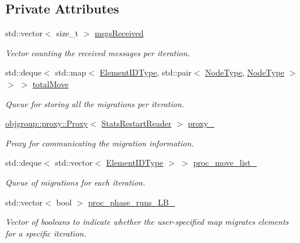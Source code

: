 \subsection*{Private Attributes}
\begin{DoxyCompactItemize}
\item 
std\+::vector$<$ size\+\_\+t $>$ \hyperlink{structvt_1_1vrt_1_1collection_1_1balance_1_1_stats_restart_reader_aac24c7a1c06519aaa6b3af18276415b4}{msgs\+Received}
\begin{DoxyCompactList}\small\item\em Vector counting the received messages per iteration. \end{DoxyCompactList}\item 
std\+::deque$<$ std\+::map$<$ \hyperlink{namespacevt_1_1vrt_1_1collection_1_1balance_a14c8d2c972f2913aa3f1636e5be0a120}{Element\+I\+D\+Type}, std\+::pair$<$ \hyperlink{namespacevt_a866da9d0efc19c0a1ce79e9e492f47e2}{Node\+Type}, \hyperlink{namespacevt_a866da9d0efc19c0a1ce79e9e492f47e2}{Node\+Type} $>$ $>$ $>$ \hyperlink{structvt_1_1vrt_1_1collection_1_1balance_1_1_stats_restart_reader_aabfc46df6681168e7f982c8b7ea5c778}{total\+Move}
\begin{DoxyCompactList}\small\item\em Queue for storing all the migrations per iteration. \end{DoxyCompactList}\item 
\hyperlink{structvt_1_1objgroup_1_1proxy_1_1_proxy}{objgroup\+::proxy\+::\+Proxy}$<$ \hyperlink{structvt_1_1vrt_1_1collection_1_1balance_1_1_stats_restart_reader}{Stats\+Restart\+Reader} $>$ \hyperlink{structvt_1_1vrt_1_1collection_1_1balance_1_1_stats_restart_reader_ad4039b19a32b7269be28d2a66322c7e3}{proxy\+\_\+}
\begin{DoxyCompactList}\small\item\em Proxy for communicating the migration information. \end{DoxyCompactList}\item 
std\+::deque$<$ std\+::vector$<$ \hyperlink{namespacevt_1_1vrt_1_1collection_1_1balance_a14c8d2c972f2913aa3f1636e5be0a120}{Element\+I\+D\+Type} $>$ $>$ \hyperlink{structvt_1_1vrt_1_1collection_1_1balance_1_1_stats_restart_reader_ac2cb2c9b607fcf696456cb758d3cfeae}{proc\+\_\+move\+\_\+list\+\_\+}
\begin{DoxyCompactList}\small\item\em Queue of migrations for each iteration. \end{DoxyCompactList}\item 
std\+::vector$<$ bool $>$ \hyperlink{structvt_1_1vrt_1_1collection_1_1balance_1_1_stats_restart_reader_a52d652c1465e46f12d5915bc98dc618b}{proc\+\_\+phase\+\_\+runs\+\_\+\+L\+B\+\_\+}
\begin{DoxyCompactList}\small\item\em Vector of booleans to indicate whether the user-\/specified map migrates elements for a specific iteration. \end{DoxyCompactList}\end{DoxyCompactItemize}
